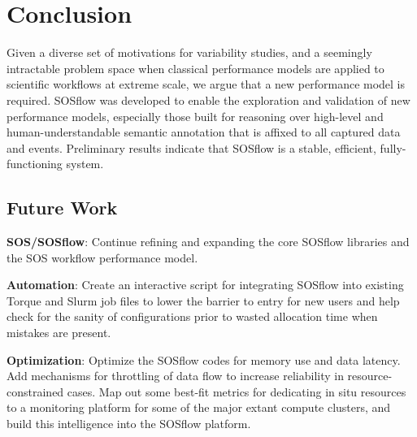 
\section{Conclusion}
Given a diverse set of motivations for variability studies, and a
seemingly intractable problem space when classical performance models
are applied to scientific workflows at extreme scale, we argue that a
new performance model is required. SOSflow was developed to enable the
exploration and validation of new performance models, especially those
built for reasoning over high-level and human-understandable semantic
annotation that is affixed to all captured data and events. Preliminary
results indicate that SOSflow is a stable, efficient, fully-functioning
system.



%



\subsection{Future Work}

\textbf{SOS/SOSflow}: Continue refining and expanding the core SOSflow
libraries and the SOS workflow performance model.

\textbf{Automation}: Create an interactive script for integrating
SOSflow into existing Torque and Slurm job files to lower the barrier
to entry for new users and help check for the sanity of configurations
prior to wasted allocation time when mistakes are present.

\textbf{Optimization}: Optimize the SOSflow codes for memory use and
data latency. Add mechanisms for throttling of data flow to increase
reliability in resource-constrained cases. Map out some best-fit
metrics for dedicating in situ resources to a monitoring platform for
some of the major extant compute clusters, and build this intelligence
into the SOSflow platform.

